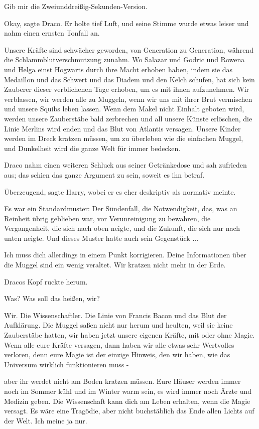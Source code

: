 \glqq{}Gib mir die Zweiunddreißig-Sekunden-Version.\grqq{}

\glqq{}Okay\grqq{}, sagte Draco. Er holte tief Luft, und seine Stimme wurde
etwas leiser und nahm einen ernsten Tonfall an.

\glqq{}Unsere Kräfte sind schwächer geworden, von Generation zu Generation,
während die Schlammblutverschmutzung zunahm. Wo Salazar und Godric und Rowena
und Helga einst Hogwarts durch ihre Macht erhoben haben, indem sie das Medaillon
und das Schwert und das Diadem und den Kelch schufen, hat sich kein Zauberer
dieser verblichenen Tage erhoben, um es mit ihnen aufzunehmen. Wir verblassen,
wir werden alle zu Muggeln, wenn wir uns mit ihrer Brut vermischen und unsere
Squibs leben lassen. Wenn dem Makel nicht Einhalt geboten wird, werden unsere
Zauberstäbe bald zerbrechen und all unsere Künste erlöschen, die Linie Merlins
wird enden und das Blut von Atlantis versagen. Unsere Kinder werden im Dreck
kratzen müssen, um zu überleben wie die einfachen Muggel, und Dunkelheit wird
die ganze Welt für immer bedecken.\grqq{}

Draco nahm einen weiteren Schluck aus seiner Getränkedose und sah zufrieden aus;
das schien das ganze Argument zu sein, soweit es ihn betraf.

\glqq{}Überzeugend\grqq{}, sagte Harry, wobei er es eher deskriptiv als normativ
meinte.

Es war ein Standardmuster: Der Sündenfall, die Notwendigkeit, das, was an
Reinheit übrig geblieben war, vor Verunreinigung zu bewahren, die Vergangenheit,
die sich nach oben neigte, und die Zukunft, die sich nur nach unten neigte. Und
dieses Muster hatte auch sein Gegenstück ...

\glqq{}Ich muss dich allerdings in einem Punkt korrigieren. Deine Informationen
über die Muggel sind ein wenig veraltet. Wir kratzen nicht mehr in der
Erde.\grqq{}

Dracos Kopf ruckte herum.

\glqq{}Was? Was soll das heißen, wir?\grqq{}

\glqq{}Wir. Die Wissenschaftler. Die Linie von Francis Bacon und das Blut der
Aufklärung. Die Muggel saßen nicht nur herum und heulten, weil sie keine
Zauberstäbe hatten, wir haben jetzt unsere eigenen Kräfte, mit oder ohne Magie.
Wenn alle eure Kräfte versagen, dann haben wir alle etwas sehr Wertvolles
verloren, denn eure Magie ist der einzige Hinweis, den wir haben, wie das
Universum wirklich funktionieren muss -

aber ihr werdet nicht am Boden kratzen müssen. Eure Häuser werden immer noch im
Sommer kühl und im Winter warm sein, es wird immer noch Ärzte und Medizin geben.
Die Wissenschaft kann dich am Leben erhalten, wenn die Magie versagt. Es wäre
eine Tragödie, aber nicht buchstäblich das Ende allen Lichts auf der Welt. Ich
meine ja nur.\grqq{}

